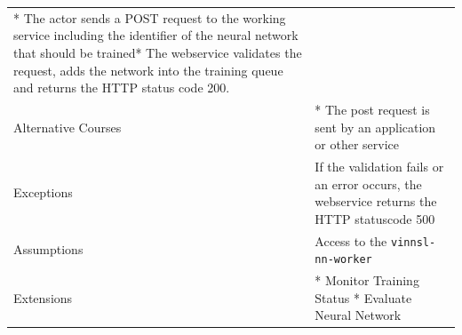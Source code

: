 \begin{longtable}[]{@{}ll@{}}
\begin{minipage}[t]{0.68\columnwidth}
* The actor sends a POST request to the working service including the
identifier of the neural network that should be trained* The webservice
validates the request, adds the network into the training queue and
returns the HTTP status code 200.\strut
\end{minipage}\tabularnewline
\begin{minipage}[t]{0.27\columnwidth}\raggedright\strut
Alternative Courses\strut
\end{minipage} & \begin{minipage}[t]{0.68\columnwidth}\raggedright\strut
* The post request is sent by an application or other service\strut
\end{minipage}\tabularnewline
\begin{minipage}[t]{0.27\columnwidth}\raggedright\strut
Exceptions\strut
\end{minipage} & \begin{minipage}[t]{0.68\columnwidth}\raggedright\strut
If the validation fails or an error occurs, the webservice returns the
HTTP statuscode 500\strut
\end{minipage}\tabularnewline
\begin{minipage}[t]{0.27\columnwidth}\raggedright\strut
Assumptions\strut
\end{minipage} & \begin{minipage}[t]{0.68\columnwidth}\raggedright\strut
Access to the \texttt{vinnsl-nn-worker}\strut
\end{minipage}\tabularnewline
\begin{minipage}[t]{0.27\columnwidth}\raggedright\strut
Extensions\strut
\end{minipage} & \begin{minipage}[t]{0.68\columnwidth}\raggedright\strut
* Monitor Training Status * Evaluate Neural Network\strut
\end{minipage}\tabularnewline
\bottomrule
\end{longtable}

